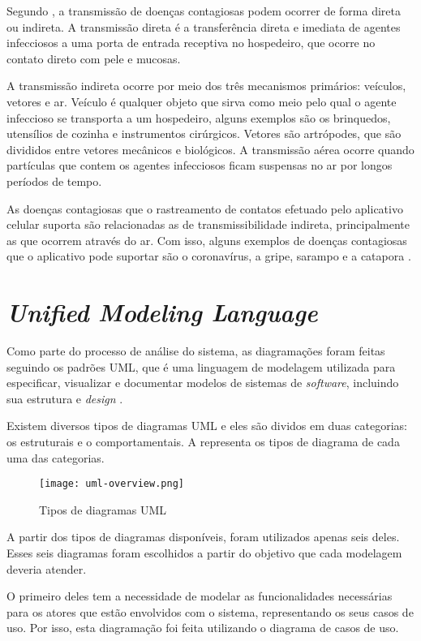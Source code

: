 Segundo \textcite{Duncan2013}, a transmissão de doenças contagiosas podem ocorrer de forma direta ou indireta. A transmissão direta é a transferência direta e imediata de agentes infecciosos a uma porta de entrada receptiva no hospedeiro, que ocorre no contato direto com pele e mucosas. 

A transmissão indireta ocorre por meio dos três mecanismos primários: veículos, vetores e ar. Veículo é qualquer objeto que sirva como meio pelo qual o agente infeccioso se transporta a um hospedeiro, alguns exemplos são os brinquedos, utensílios de cozinha e instrumentos cirúrgicos. Vetores são artrópodes, que são divididos entre vetores mecânicos e biológicos. A transmissão aérea ocorre quando partículas que contem os agentes infecciosos ficam suspensas no ar por longos períodos de tempo.

As doenças contagiosas que o rastreamento de contatos efetuado pelo aplicativo celular suporta são relacionadas as de transmissibilidade indireta, principalmente as que ocorrem através do ar. Com isso, alguns exemplos de doenças contagiosas que o aplicativo pode suportar são o coronavírus, a gripe, sarampo e a catapora \cite{Descomplica}.

\section{\textit{Unified Modeling Language}}\label{sec:uml}
Como parte do processo de análise do sistema, as diagramações foram feitas seguindo os padrões UML, que é uma linguagem de modelagem utilizada para especificar, visualizar e documentar modelos de sistemas de \textit{software}, incluindo sua estrutura e \textit{design} \cite{uml}.

Existem diversos tipos de diagramas UML e eles são dividos em duas categorias: os estruturais e o comportamentais. A  representa os tipos de diagrama de cada uma das categorias.

\begin{figure}[!htb]
    \centering
    \texttt{[image: uml-overview.png]}
    \caption{Tipos de diagramas UML}
    \label{fig:umloverview}
\end{figure}

A partir dos tipos de diagramas disponíveis, foram utilizados apenas seis deles. Esses seis diagramas foram escolhidos a partir do objetivo que cada modelagem deveria atender. 

O primeiro deles tem a necessidade de modelar as funcionalidades necessárias para os atores que estão envolvidos com o sistema, representando os seus casos de uso. Por isso, esta diagramação foi feita utilizando o diagrama de casos de uso.


